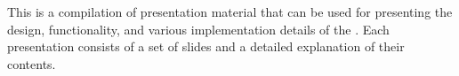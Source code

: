 





{This \documentation{} is a compilation of presentation material that can be used for presenting the design, functionality, and various implementation details of the \ecs{}.
Each presentation consists of a set of slides and a detailed explanation of their contents.}

\ifbook
\newcommand{\thepresentation}{}\setlength{\marginparwidth}{15em}\setlength{\marginparsep}{-\marginparwidth}
\newcommand{\slide}[1]{\marginpar{\framebox{\pgfimage[width=\dimexpr\marginparwidth-2\fboxrule-2\fboxsep,page=#1]{\thepresentation}}}}
\newenvironment{presentation}[2]{\section{#1}\marginpar{}\renewcommand{\thepresentation}{#2}\begin{adjustwidth}{}{\marginparwidth+1em}}{\end{adjustwidth}}
\else
\newcommand{\thepresentation}{}
\newcommand{\slide}[1]{\begin{center}\framebox{\pgfimage[height=25ex,page=#1]{\thepresentation}}\end{center}}
\newenvironment{presentation}[2]{\bigskip\begin{multicols}{2}[\section{#1}]\renewcommand{\thepresentation}{#2}}{\end{multicols}}
\fi

